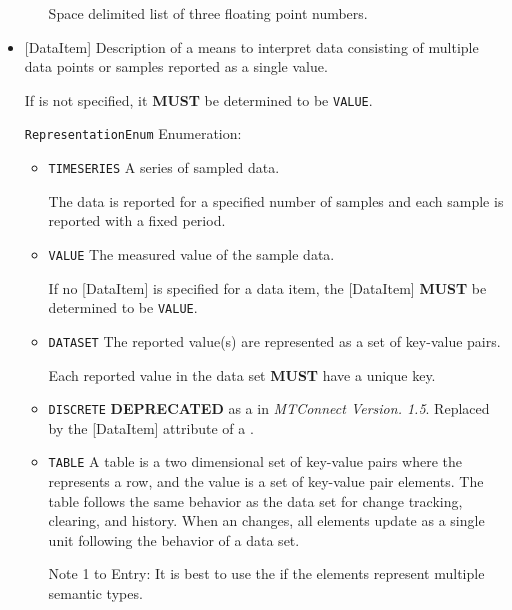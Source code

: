 \begin{itemize}
\begin{itemize}
Space delimited list of three floating point numbers. 
\end{itemize}


\item {}[DataItem] \newline Description of a means to interpret data consisting of multiple data points or samples reported as a single value.  

If  is not specified, it \textbf{MUST} be determined to be \texttt{VALUE}.


\texttt{RepresentationEnum} Enumeration:

\begin{itemize}
\item \texttt{TIME\textunderscore SERIES} \newline A series of sampled data.

The data is reported for a specified number of samples and each sample is reported with a fixed period. 
\item \texttt{VALUE} \newline The measured value of the sample data.

If no [DataItem] is specified for a data item, the [DataItem] \textbf{MUST} be determined to be \texttt{VALUE}. 
\item \texttt{DATA\textunderscore SET} \newline The reported value(s) are represented as a set of \glspl{key-value pair}.

Each reported value in the \gls{data set} \textbf{MUST} have a unique key. 
\item \texttt{DISCRETE} \newline \textbf{DEPRECATED} as a  in \textit{MTConnect Version. 1.5}. Replaced by the [DataItem] attribute of a . 
\item \texttt{TABLE} \newline A \gls{table} is a two dimensional set of \glspl{key-value pair} where the  represents a row, and the value is a set of \gls{key-value pair}  elements. The \gls{table} follows the same behavior as the \gls{data set} for change tracking, clearing, and history. When an  changes, all  elements update as a single unit following the behavior of a \gls{data set}.

Note 1 to Entry: It is best to use the    if the  elements represent multiple
semantic types.


\end{itemize}
\end{itemize}
